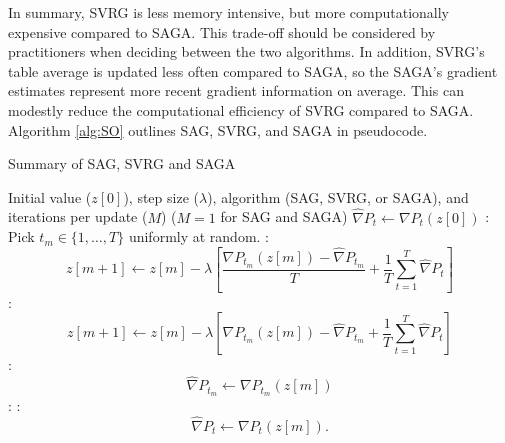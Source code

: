 In summary, SVRG is less memory intensive, but more computationally expensive compared to SAGA. This trade-off should be considered by practitioners when deciding between the two algorithms. In addition, SVRG's table average is updated less often compared to SAGA, so the SAGA's gradient estimates represent more recent gradient information on average. This can modestly reduce the computational efficiency of SVRG compared to SAGA. Algorithm \ref{alg:SO} outlines SAG, SVRG, and SAGA in pseudocode.

\begin{algorithm}
\caption{Summary of SAG, SVRG and SAGA}\label{alg:SO}
\begin{algorithmic}[1]
\Require Initial value ($z[0]$), step size ($\lambda$), algorithm (SAG, SVRG, or SAGA), and iterations per update ($M$) ($M = 1$ for SAG and SAGA)
%
    \State $\widehat \nabla P_t \leftarrow \nabla P_t (z[0])$ 
\EndFor
%
:
    \State Pick $t_m \in \{1,\ldots,T\}$ uniformly at random.
    :
        \begin{equation}
            z[m+1] \gets z[m] - \lambda \left[\frac{\nabla P_{t_m}(z[m]) - \widehat \nabla P_{t_m}}{T} + \frac{1}{T} \sum_{t=1}^T \widehat \nabla P_{t} \right] \label{eqn:SAG_update0}
        \end{equation}
    :
        \begin{equation}
            z[m+1] \gets z[m] - \lambda \left[\nabla P_{t_m}(z[m]) - \widehat \nabla P_{t_m} + \frac{1}{T} \sum_{t=1}^T \widehat \nabla P_{t} \right]
            \label{eqn:SAGA_update0}
        \end{equation}
    \EndIf
    :
        \begin{equation}
            \widehat \nabla P_{t_m} \leftarrow \nabla P_{t_m}(z[m]) 
        \end{equation}
    :  
        :
            \begin{equation}
                \widehat \nabla P_{t} \leftarrow \nabla P_{t}(z[m]).
            \end{equation}
        \EndFor
    \EndIf
\EndFor
\end{algorithmic}
\end{algorithm}

